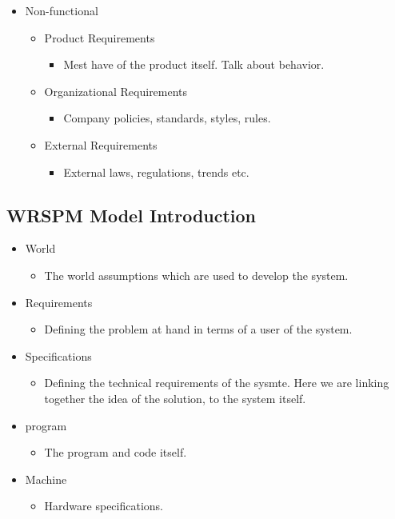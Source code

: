 \documentclass{article}
\begin{document}
    \begin{itemize}
        \item Non-functional
        \begin{itemize}
            \item Product Requirements
            \begin{itemize}
                \item Mest have of the product itself. Talk about behavior.
            \end{itemize}
            \item Organizational Requirements
            \begin{itemize}
                \item Company policies, standards, styles, rules.
            \end{itemize}
            \item External Requirements
            \begin{itemize}
                \item External laws, regulations, trends etc.
            \end{itemize}
        \end{itemize}
    \end{itemize}

    \subsection{WRSPM Model Introduction}

    \begin{itemize}
        \item World
        \begin{itemize}
            \item The world assumptions which are used to develop the system.
        \end{itemize}
        \item Requirements
        \begin{itemize}
            \item Defining the problem at hand in terms of a user of the system.
        \end{itemize}
        \item Specifications
        \begin{itemize}
            \item Defining the technical requirements of the sysmte. Here we are linking together the idea of the solution, to the system itself.
        \end{itemize}
        \item program
        \begin{itemize}
            \item The program and code itself.
        \end{itemize}
        \item Machine
        \begin{itemize}
            \item Hardware specifications.
        \end{itemize}
    \end{itemize}
\end{document}
